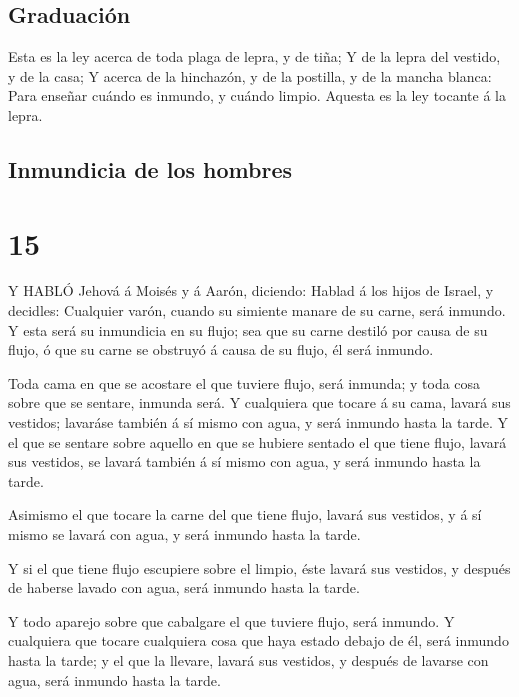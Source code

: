 \hypertarget{graduaciuxf3n}{%
\subsection{Graduación}\label{graduaciuxf3n}}

 Esta es la ley acerca de toda plaga de lepra, y de tiña;
 Y de la lepra del vestido, y de la casa;  Y
acerca de la hinchazón, y de la postilla, y de la mancha blanca:
 Para enseñar cuándo es inmundo, y cuándo limpio. Aquesta
es la ley tocante á la lepra.

\hypertarget{inmundicia-de-los-hombres}{%
\subsection{Inmundicia de los hombres}\label{inmundicia-de-los-hombres}}

\hypertarget{section-14}{%
\section{15}\label{section-14}}

 Y HABLÓ Jehová á Moisés y á Aarón, diciendo: 
Hablad á los hijos de Israel, y decidles: Cualquier varón, cuando su
simiente manare de su carne, será inmundo.  Y esta será su
inmundicia en su flujo; sea que su carne destiló por causa de su flujo,
ó que su carne se obstruyó á causa de su flujo, él será inmundo.

 Toda cama en que se acostare el que tuviere flujo, será
inmunda; y toda cosa sobre que se sentare, inmunda será.  Y
cualquiera que tocare á su cama, lavará sus vestidos; lavaráse también á
sí mismo con agua, y será inmundo hasta la tarde.  Y el que
se sentare sobre aquello en que se hubiere sentado el que tiene flujo,
lavará sus vestidos, se lavará también á sí mismo con agua, y será
inmundo hasta la tarde.

 Asimismo el que tocare la carne del que tiene flujo, lavará
sus vestidos, y á sí mismo se lavará con agua, y será inmundo hasta la
tarde.

 Y si el que tiene flujo escupiere sobre el limpio, éste
lavará sus vestidos, y después de haberse lavado con agua, será inmundo
hasta la tarde.

 Y todo aparejo sobre que cabalgare el que tuviere flujo,
será inmundo.  Y cualquiera que tocare cualquiera cosa que
haya estado debajo de él, será inmundo hasta la tarde; y el que la
llevare, lavará sus vestidos, y después de lavarse con agua, será
inmundo hasta la tarde.

